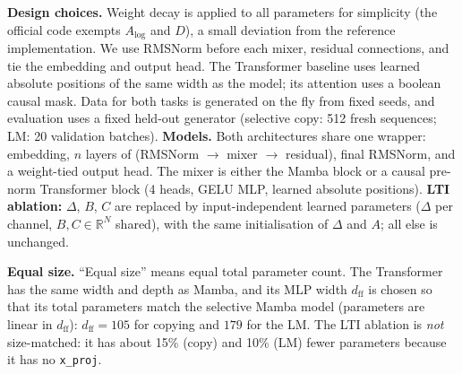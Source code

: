 \documentclass[10pt,twocolumn]{article}
\begin{document}
\begin{figure}[h]\small\centering{}\label{alg:scan}\end{figure}
\textbf{Design choices.} Weight decay is applied to all parameters for simplicity (the official code exempts $A_{\log}$ and $D$), a small deviation from the reference implementation. We use RMSNorm before each mixer, residual connections, and tie the embedding and output head. The Transformer baseline uses learned absolute positions of the same width as the model; its attention uses a boolean causal mask. Data for both tasks is generated on the fly from fixed seeds, and evaluation uses a fixed held-out generator (selective copy: 512 fresh sequences; LM: 20 validation batches).
\textbf{Models.} Both architectures share one wrapper: embedding, $n$ layers of (RMSNorm $\to$ mixer $\to$ residual), final RMSNorm, and a weight-tied output head. The mixer is either the Mamba block or a causal pre-norm Transformer block (4 heads, GELU MLP, learned absolute positions). \textbf{LTI ablation:} $\Delta$, $B$, $C$ are replaced by input-independent learned parameters ($\Delta$ per channel, $B,C\in\mathbb R^N$ shared), with the same initialisation of $\Delta$ and $A$; all else is unchanged.

\textbf{Equal size.} ``Equal size'' means equal total parameter count. The Transformer has the same width and depth as Mamba, and its MLP width $d_{\text{ff}}$ is chosen so that its total parameters match the selective Mamba model (parameters are linear in $d_{\text{ff}}$): $d_{\text{ff}}=105$ for copying and $179$ for the LM. The LTI ablation is \emph{not} size-matched: it has about 15\% (copy) and 10\% (LM) fewer parameters because it has no \texttt{x\_proj}.
\end{document}
